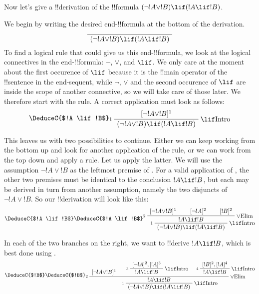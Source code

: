 \documentclass[../../../include/open-logic-section]{subfiles}
\begin{document}
\begin{ex}
Now let's give a !!{derivation} of the !!{formula} $(\lnot !A \lor !B)
\lif (!A \lif !B)$.

We begin by writing the desired end-!!{formula} at the bottom of the 
derivation.
\[
\AxiomC{}
\UnaryInfC{$(\lnot !A \lor !B) \lif (!A \lif !B)$}
\DisplayProof
\]
To find a logical rule that could give us this end-!!{formula}, we
look at the logical connectives in the end-!!{formula}: $\lnot$,
$\lor$, and $\lif$. We only care at the moment about the first
occurence of $\lif$ because it is the !!{main operator} of the
!!{sentence} in the end-sequent, while $\lnot$, $\lor$ and the second
occurence of $\lif$ are inside the scope of another connective, so we
will take care of those later. We therefore start with the
\Intro{\lif} rule.  A correct application must look as follows:
\[
\AxiomC{$\Discharge{\lnot !A \lor !B}{1}$}
\DeduceC{$!A \lif !B$}
\DischargeRule{\Intro{\lif}}{1}
\UnaryInfC{$(\lnot !A \lor !B) \lif (!A \lif !B)$}
\DisplayProof
\]

This leaves us with two possibilities to continue. Either we can
keep working from the bottom up and look for another application
of the \Intro{\lif} rule, or we can work from the top down and apply a
\Elim{\lor} rule. Let us apply the latter. We will use the assumption
$\lnot !A \lor !B$ as the leftmost premise of \Elim{\lor}.  For a valid
application of \Elim{\lor}, the other two premises must be identical
to the conclusion $!A \lif !B$, but each may be derived in turn from
another assumption, namely the two disjuncts of $\lnot !A \lor !B$.
So our !!{derivation} will look like this:
\[
\AxiomC{$\Discharge{\lnot !A \lor !B}{1}$}
\AxiomC{$\Discharge{\lnot !A}{2}$}
\DeduceC{$!A \lif !B$}
\AxiomC{$\Discharge{!B}{2}$}
\DeduceC{$!A \lif !B$}
\DischargeRule{\Elim{\lor}}{2}
\TrinaryInfC{$!A \lif !B$}
\DischargeRule{\Intro{\lif}}{1} 
\UnaryInfC{$(\lnot !A \lor !B) \lif (!A \lif !B)$}
\DisplayProof
\]

In each of the two branches on the right, we want to !!{derive} $!A
\lif !B$, which is best done using \Intro{\lif}.
\[
\AxiomC{$\Discharge{\lnot !A \lor !B}{1}$}
\AxiomC{$\Discharge{\lnot !A}{2}, \Discharge{!A}{3}$}
\DeduceC{$!B$}
\DischargeRule{\Intro{\lif}}{3}
\UnaryInfC{$!A \lif !B$}
\AxiomC{$\Discharge{!B}{2}, \Discharge{!A}{4}$}
\DeduceC{$!B$}
\DischargeRule{\Intro{\lif}}{4}
\UnaryInfC{$!A \lif !B$}
\DischargeRule{\Elim{\lor}}{2}
\TrinaryInfC{$!A \lif !B$}
\DischargeRule{\Intro{\lif}}{1} 
\UnaryInfC{$(\lnot !A \lor !B) \lif (!A \lif !B)$}
\DisplayProof
\]


\end{ex}
\end{document}
